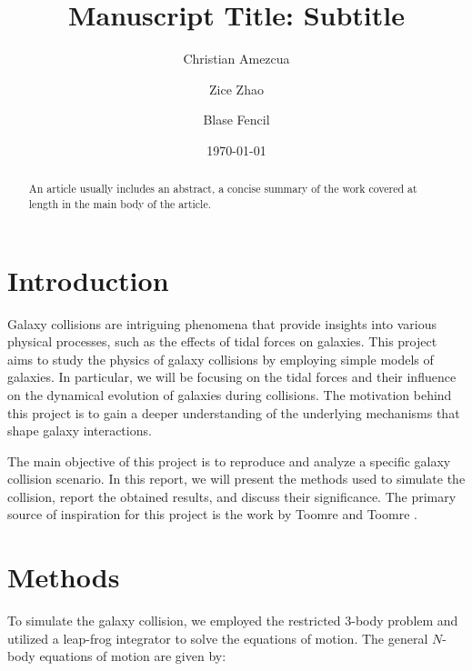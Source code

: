 \documentclass[reprint, amsmath, amssymb, aps]{revtex4-2}
\begin{document}
\title{Manuscript Title: Subtitle}

\author{Christian Amezcua}
\author{Zice Zhao}
\author{Blase Fencil}



\date{\today}

\begin{abstract}
An article usually includes an abstract, a concise summary of the work covered at length in the main body of the article.
\end{abstract}

\maketitle

\section{Introduction}
\label{sec:intro}

Galaxy collisions are intriguing phenomena that provide insights into various physical processes, such as the effects of tidal forces on galaxies. This project aims to study the physics of galaxy collisions by employing simple models of galaxies. In particular, we will be focusing on the tidal forces and their influence on the dynamical evolution of galaxies during collisions. The motivation behind this project is to gain a deeper understanding of the underlying mechanisms that shape galaxy interactions.

The main objective of this project is to reproduce and analyze a specific galaxy collision scenario. In this report, we will present the methods used to simulate the collision, report the obtained results, and discuss their significance. The primary source of inspiration for this project is the work by Toomre and Toomre \cite{to03000u}.

\section{Methods}
\label{sec:methods}

To simulate the galaxy collision, we employed the restricted 3-body problem and utilized a leap-frog integrator to solve the equations of motion. The general $N$-body equations of motion are given by:
\end{document}

